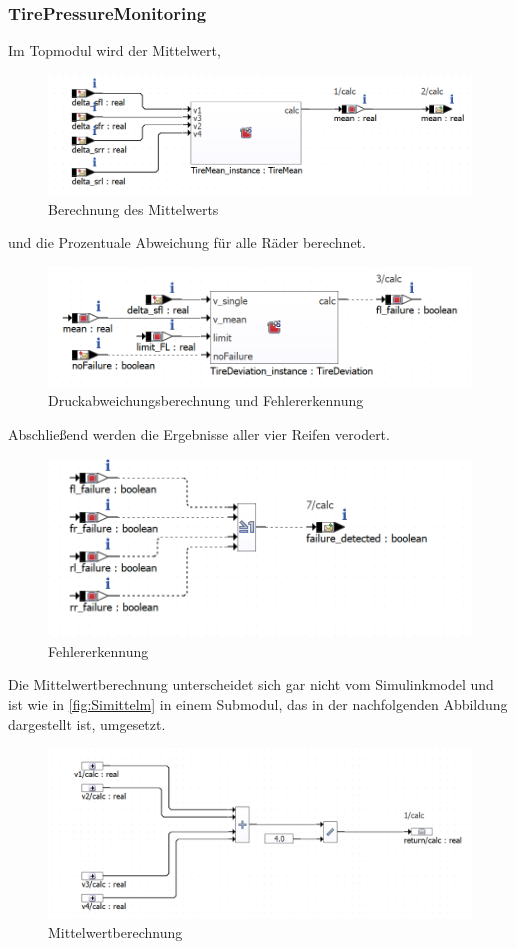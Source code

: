 \subsubsection{TirePressureMonitoring}
Im Topmodul wird der Mittelwert,
\begin{figure}[H]
	\centering
	\includegraphics[width=0.7\linewidth]{../Graphiken/mean}
	\caption{Berechnung des Mittelwerts}
	\label{fig:Simittelm}
\end{figure}
und die Prozentuale Abweichung für alle Räder berechnet.
\begin{figure}[H]
	\centering
	\includegraphics[width=0.7\linewidth]{../Graphiken/deviation}
	\caption{Druckabweichungsberechnung und Fehlererkennung}
	\label{fig:abweichung}
\end{figure}
Abschließend werden die Ergebnisse aller vier Reifen verodert.
\begin{figure}[H]
	\centering
	\includegraphics[width=0.7\linewidth]{../Graphiken/or}
	\caption{Fehlererkennung}
	\label{fig:fehler}
\end{figure}
Die Mittelwertberechnung unterscheidet sich gar nicht vom Simulinkmodel und ist wie in \autoref{fig:Simittelm} in einem Submodul, das in der nachfolgenden Abbildung dargestellt ist, umgesetzt.
\begin{figure}[H]
	\centering
	\includegraphics[width=0.8\linewidth]{../Graphiken/meanCalc}
	\caption{Mittelwertberechnung}
	\label{fig:mittel}
\end{figure}
